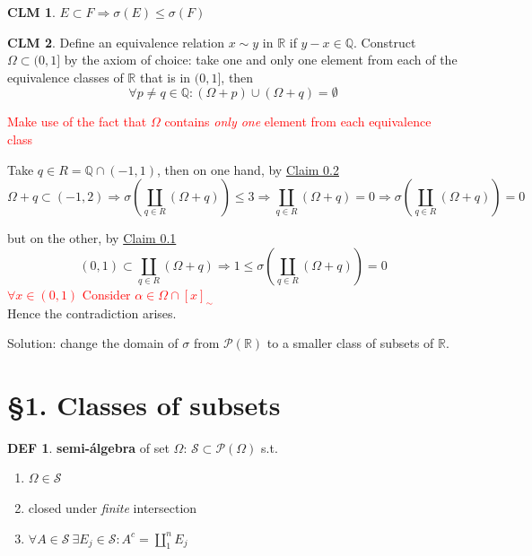 \documentclass[hidelinks]{article}
\theoremstyle{definition}
\newtheorem*{defin}{DEF}
\theoremstyle{dotless}
\newtheorem{claim}{CLM}[section]
\theoremstyle{remark}
\begin{document}
\begin{claim}\label{CLM 0.1}
$E\subset F\Rightarrow \sigma(E)\leq \sigma(F)$
\end{claim}

\begin{claim}\label{CLM 0.2}
Define an equivalence relation $x\sim y$ in $\mathbb{R}$ if $y-x\in \mathbb{Q}$. Construct $\Omega\subset (0,1]$ by the axiom of choice: take one and only one element from each of the equivalence classes of $\mathbb{R}$ that is in $(0,1]$, then
\[\forall p\neq q\in \mathbb{Q}:(\Omega+p)\cup(\Omega+q)=\emptyset\]
\end{claim}
\textcolor{red}{Make use of the fact that $\Omega$ contains \emph{only one} element from each equivalence class}\bigbreak

Take $q\in R=\mathbb{Q}\cap(-1,1)$, then on one hand, by \hyperref[CLM 0.2]{Claim 0.2}
\[\Omega +q\subset(-1,2)\Rightarrow\sigma(\coprod_{q\in R}(\Omega+q))\leq 3\Rightarrow\coprod_{q\in R}(\Omega+q)=0\Rightarrow\sigma(\coprod_{q\in R}(\Omega+q))=0\]

but on the other, by \hyperref[CLM 0.1]{Claim 0.1}
\[(0,1)\subset\coprod_{q\in R}(\Omega+q)\Rightarrow 1\leq\sigma(\coprod_{q\in R}(\Omega+q))=0\]
\textcolor{red}{$\forall x\in (0,1)$ Consider $\alpha\in\Omega\cap[x]_\sim$}\\
Hence the contradiction arises. \bigbreak

Solution: change the domain of $\sigma$ from $\mathscr{P}(\mathbb{R})$ to a smaller class of subsets of $\mathbb{R}$.

\bigbreak

\section*{\S1. Classes of subsets}
\setcounter{section}{1}

\begin{defin}
\textbf{semi-álgebra} of set $\Omega$: $\mathscr{S}\subset\mathscr{P}(\Omega)$ s.t.
\begin{enumerate}[label=\arabic*\degree]
    \item $\Omega\in\mathscr{S}$
    \item closed under \emph{finite} intersection
    \item $\forall A\in\mathscr{S}\ \exists E_j\in\mathscr{S}:A^c=\coprod\limits_1^nE_j$
\end{enumerate}
\end{defin}
\end{document}
